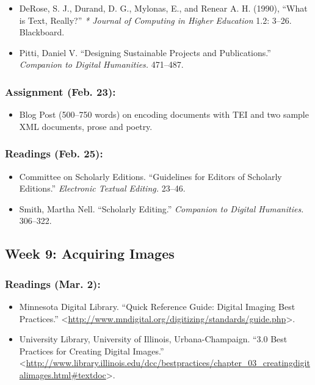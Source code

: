 \documentclass[]{article}
\begin{document}
\begin{itemize}
\itemsep1pt\parskip0pt
\item
  DeRose, S. J., Durand, D. G., Mylonas, E., and Renear A. H. (1990),
  ``What is Text, Really?'' \emph{* Journal of Computing in Higher
  Education} 1.2: 3--26. Blackboard.
\item
  Pitti, Daniel V. ``Designing Sustainable Projects and Publications.''
  \emph{Companion to Digital Humanities.} 471--487.
\end{itemize}

\subsubsection{Assignment (Feb. 23):}\label{assignment-feb.-23}

\begin{itemize}
\itemsep1pt\parskip0pt
\item
  Blog Post (500--750 words) on encoding documents with TEI and two
  sample XML documents, prose and poetry.
\end{itemize}

\subsubsection{Readings (Feb. 25):}\label{readings-feb.-25}

\begin{itemize}
\itemsep1pt\parskip0pt
\item
  Committee on Scholarly Editions. ``Guidelines for Editors of Scholarly
  Editions.'' \emph{Electronic Textual Editing.} 23--46.
\item
  Smith, Martha Nell. ``Scholarly Editing.'' \emph{Companion to Digital
  Humanities.} 306--322.
\end{itemize}

\subsection{Week 9: Acquiring Images}\label{week-9-acquiring-images}

\subsubsection{Readings (Mar. 2):}\label{readings-mar.-2}

\begin{itemize}
\itemsep1pt\parskip0pt
\item
  Minnesota Digital Library. ``Quick Reference Guide: Digital Imaging
  Best Practices.''
  \textless{}\url{http://www.mndigital.org/digitizing/standards/guide.php}\textgreater{}.
\item
  University Library, University of Illinois, Urbana-Champaign. ``3.0
  Best Practices for Creating Digital Images.''
  \textless{}\url{http://www.library.illinois.edu/dcc/bestpractices/chapter_03_creatingdigitalimages.html\#textdoc}\textgreater{}.
\end{itemize}
\end{document}
